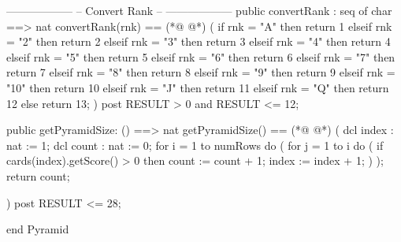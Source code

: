 \begin{vdmpp}[breaklines=true]
  
  ------------------
  -- Convert Rank --
  ------------------
  public convertRank : seq of char ==> nat
  convertRank(rnk) == 
(*@
\label{convertRank:192}
@*)
  (
   if rnk = "A" then return 1
   elseif rnk = "2" then return 2
   elseif rnk = "3" then return 3
   elseif rnk = "4" then return 4
   elseif rnk = "5" then return 5
   elseif rnk = "6" then return 6
   elseif rnk = "7" then return 7
   elseif rnk = "8" then return 8
   elseif rnk = "9" then return 9
   elseif rnk = "10" then return 10
   elseif rnk = "J"  then return 11
   elseif rnk = "Q"  then return 12
   else return 13;
  )
  post RESULT > 0 and RESULT <= 12;
  
  public getPyramidSize: () ==> nat
  getPyramidSize() ==
(*@
\label{getPyramidSize:211}
@*)
  (
   dcl index : nat := 1;
   dcl count : nat := 0;
   for i = 1 to numRows do
   (
    for j = 1 to i do
    (
     if cards(index).getScore() > 0 then count := count + 1;
     index := index + 1;
    )
   );
   return count;
  
  )
  post RESULT <= 28;
  
  
  
end Pyramid
\end{vdmpp}
